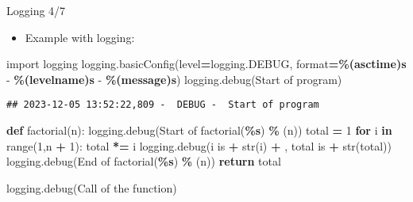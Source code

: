 \documentclass[
  8pt,
  ignorenonframetext,
]{beamer}
\newenvironment{Shaded}{\begin{snugshade}}{\end{snugshade}}
\newcommand{\BuiltInTok}[1]{#1}
\newcommand{\ControlFlowTok}[1]{\textcolor[rgb]{0.13,0.29,0.53}{\textbf{#1}}}
\newcommand{\DecValTok}[1]{\textcolor[rgb]{0.00,0.00,0.81}{#1}}
\newcommand{\ImportTok}[1]{#1}
\newcommand{\KeywordTok}[1]{\textcolor[rgb]{0.13,0.29,0.53}{\textbf{#1}}}
\newcommand{\NormalTok}[1]{#1}
\newcommand{\OperatorTok}[1]{\textcolor[rgb]{0.81,0.36,0.00}{\textbf{#1}}}
\newcommand{\SpecialCharTok}[1]{\textcolor[rgb]{0.81,0.36,0.00}{\textbf{#1}}}
\newcommand{\StringTok}[1]{\textcolor[rgb]{0.31,0.60,0.02}{#1}}
\providecommand{\tightlist}{%
  \setlength{\itemsep}{0pt}\setlength{\parskip}{0pt}}
\begin{document}
\begin{frame}[fragile]{Logging 4/7}
\protect\hypertarget{logging-47}{}
\begin{itemize}
\tightlist
\item
  Example with logging:
\end{itemize}

\begin{Shaded}
\begin{Highlighting}[]
\ImportTok{import}\NormalTok{ logging}
\NormalTok{logging.basicConfig(level}\OperatorTok{=}\NormalTok{logging.DEBUG, }\BuiltInTok{format}\OperatorTok{=}\StringTok{\textquotesingle{}}\SpecialCharTok{\%(asctime)s}\StringTok{ {-}  }\SpecialCharTok{\%(levelname)s}\StringTok{ {-}  }\SpecialCharTok{\%(message)s}\StringTok{\textquotesingle{}}\NormalTok{)}
\NormalTok{logging.debug(}\StringTok{\textquotesingle{}Start of program\textquotesingle{}}\NormalTok{)}
\end{Highlighting}
\end{Shaded}

\begin{verbatim}
## 2023-12-05 13:52:22,809 -  DEBUG -  Start of program
\end{verbatim}

\begin{Shaded}
\begin{Highlighting}[]
\KeywordTok{def}\NormalTok{ factorial(n):}
\NormalTok{    logging.debug(}\StringTok{\textquotesingle{}Start of factorial(}\SpecialCharTok{\%s}\StringTok{)\textquotesingle{}}  \OperatorTok{\%}\NormalTok{ (n))}
\NormalTok{    total }\OperatorTok{=} \DecValTok{1}
    \ControlFlowTok{for}\NormalTok{ i }\KeywordTok{in} \BuiltInTok{range}\NormalTok{(}\DecValTok{1}\NormalTok{,n }\OperatorTok{+} \DecValTok{1}\NormalTok{):}
\NormalTok{        total }\OperatorTok{*=}\NormalTok{ i}
\NormalTok{        logging.debug(}\StringTok{\textquotesingle{}i is \textquotesingle{}} \OperatorTok{+} \BuiltInTok{str}\NormalTok{(i) }\OperatorTok{+} \StringTok{\textquotesingle{}, total is \textquotesingle{}} \OperatorTok{+} \BuiltInTok{str}\NormalTok{(total))}
\NormalTok{    logging.debug(}\StringTok{\textquotesingle{}End of factorial(}\SpecialCharTok{\%s}\StringTok{)\textquotesingle{}}  \OperatorTok{\%}\NormalTok{ (n))}
    \ControlFlowTok{return}\NormalTok{ total}

\NormalTok{logging.debug(}\StringTok{\textquotesingle{}Call of the function\textquotesingle{}}\NormalTok{)}
\end{Highlighting}
\end{Shaded}


\end{frame}
\end{document}
